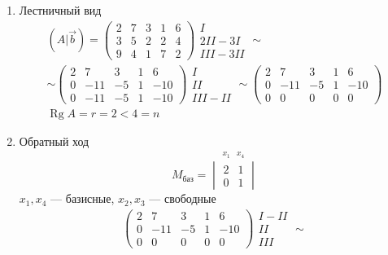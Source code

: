 \documentclass{article}
\DeclareMathOperator*{\Rg}{Rg}
\begin{document}
\begin{enumerate}
	\item Лестничный вид
	\begin{gather*}
		(A | \vec{b}) = \begin{pmatrix}
			2 & 7 & 3 & 1 & 6 \\
			3 & 5 & 2 & 2 & 4 \\
			9 & 4 & 1 & 7 & 2
		\end{pmatrix} \begin{matrix}
			I \\ 2II - 3I \\ III - 3II
		\end{matrix} \sim \\
		\sim \begin{pmatrix}
			2 & 7 & 3 & 1 & 6 \\
			0 & -11 & -5 & 1 & -10 \\
			0 & -11 & -5 & 1 & -10
		\end{pmatrix} \begin{matrix}
			I \\ II \\ III - II
		\end{matrix} \sim \begin{pmatrix}
			2 & 7 & 3 & 1 & 6 \\
			0 & -11 & -5 & 1 & -10 \\
			0 & 0 & 0 & 0 & 0
		\end{pmatrix} \\
		\Rg{A} = r = 2 < 4 = n
	\end{gather*}
	\item Обратный ход
	\[
	M_{\text{баз}} = \stackrel{\begin{matrix}
		x_1 & x_4
	\end{matrix}}{\begin{vmatrix}
		2 & 1 \\
		0 & 1
	\end{vmatrix}}
	\]
	$x_1, x_4$ --- базисные, $x_2, x_3$ --- свободные \\
	\begin{gather*}
		\begin{pmatrix}
			2 & 7 & 3 & 1 & 6 \\
			0 & -11 & -5 & 1 & -10 \\
			0 & 0 & 0 & 0 & 0
		\end{pmatrix} \begin{matrix}
			I - II \\ II \\ III
		\end{matrix} \sim

\end{gather*}
\end{enumerate}
\end{document}
